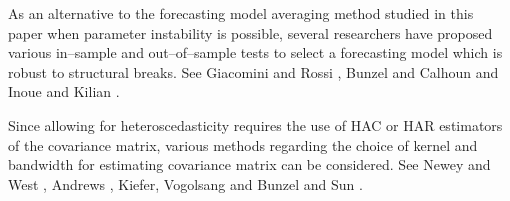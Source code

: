 As an alternative to the forecasting model averaging method studied in this paper when parameter instability is possible, several researchers have proposed various in--sample and out--of--sample tests to select a forecasting model which is robust to structural breaks. See Giacomini and Rossi \cite{giacomini_rossi_2008} \cite{giacomini_rossi_2010}, Bunzel and Calhoun \cite{bunzel_calhoun_2012} and Inoue and Kilian \cite{inoue_kilian_ER2004}.

Since allowing for heteroscedasticity requires the use of HAC or HAR estimators of the covariance matrix, various methods regarding the choice of kernel and bandwidth for estimating covariance matrix can be considered. See Newey and West \cite{newey_west_EMETRICA1987}, Andrews \cite{andrews91}, Kiefer, Vogolsang and Bunzel \cite{kvb2000} and Sun \cite{sunyixiao_2010}. 